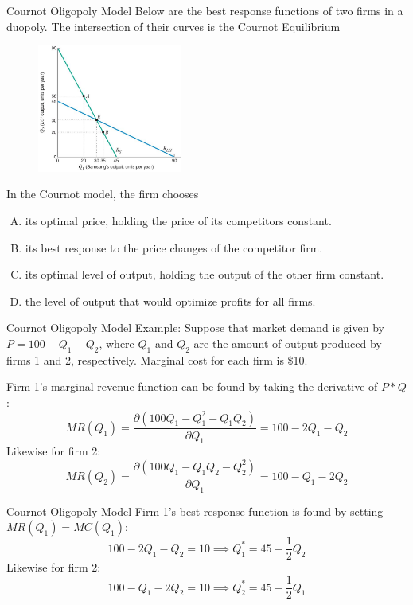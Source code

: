 \documentclass[11pt,t]{beamer}
\begin{document}
\begin{frame}{Cournot Oligopoly Model}
  Below are the best response functions of two firms in a duopoly. The intersection of their curves is the Cournot Equilibrium
  \begin{figure}
    \includegraphics[width=180px]{figures/fig13_2.jpg}
  \end{figure}
\end{frame}

\begin{frame}{}
  In the Cournot model, the firm chooses

  \begin{enumerate}[A)]
    \item its optimal price, holding the price of its competitors constant.
    \item its best response to the price changes of the competitor firm.
    \item its optimal level of output, holding the output of the other firm constant.
    \item the level of output that would optimize profits for all firms.
  \end{enumerate}
\end{frame}

\begin{frame}{Cournot Oligopoly Model}
  Example: Suppose that market demand is given by $P=100-Q_1-Q_2$, where $Q_1$ and $Q_2$ are the amount of output produced by firms 1 and 2, respectively. Marginal cost for each firm is \$10.

  \medskip
  Firm 1's marginal revenue function can be found by taking the derivative of $P*Q$:
  $$
    MR(Q_1)=\frac{\partial (100Q_1-Q_1^2-Q_1Q_2)}{\partial Q_1} = 100 - 2Q_1 - Q_2
  $$
  Likewise for firm 2:
  $$
    MR(Q_2)=\frac{\partial (100Q_1-Q_1Q_2-Q_2^2)}{\partial Q_1} = 100 - Q_1 - 2Q_2
  $$
\end{frame}

\begin{frame}{Cournot Oligopoly Model}
  Firm 1's best response function is found by setting $MR(Q_1) = MC(Q_1)$:
  $$
    100 - 2Q_1 - Q_2 = 10 \implies Q_1^* = 45 - \frac{1}{2} Q_2
  $$
  Likewise for firm 2:
  $$
    100 - Q_1 - 2Q_2 = 10 \implies Q_2^* = 45 - \frac{1}{2} Q_1
  $$
\end{frame}
\end{document}

